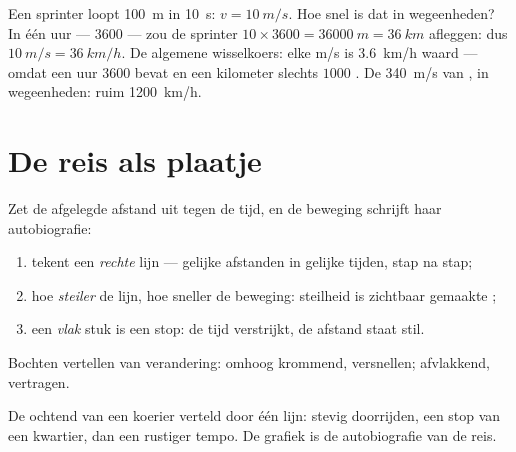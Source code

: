 \begin{example}\label{ex:g7:motion-average-speed:units}
Een sprinter loopt \qty{100}{m} in \qty{10}{s}: $v = \qty{10}{m/s}$.
Hoe snel is dat in wegeenheden? In één uur --- $3600$  ---
zou de sprinter $10 \times 3600 = \qty{36000}{m} = \qty{36}{km}$
afleggen: dus $\qty{10}{m/s} = \qty{36}{km/h}$. De algemene
wisselkoers: elke \unit{m/s} is \qty{3.6}{km/h} waard --- omdat een uur
$3600$  bevat en een kilometer slechts $1000$
. De \qty{340}{m/s} van , in
wegeenheden: ruim \qty{1200}{km/h}.
\end{example}

\section{De reis als plaatje}

\begin{proposition}[De grafiekwetten]\label{prop:g7:motion-average-speed:graphs}
Zet de afgelegde afstand uit tegen de tijd, en de beweging schrijft haar
autobiografie:
\begin{enumerate}
  \item {} tekent een \emph{rechte} lijn ---
        gelijke afstanden in gelijke tijden, stap na stap;
  \item hoe \emph{steiler} de lijn, hoe sneller de beweging:
        steilheid is zichtbaar gemaakte ;
  \item een \emph{vlak} stuk is een stop: de tijd verstrijkt, de
        afstand staat stil.
\end{enumerate}
Bochten vertellen van verandering: omhoog krommend, versnellen;
afvlakkend, vertragen.
\end{proposition}

\begin{omfigure}

{\small De ochtend van een koerier verteld door één lijn: stevig
doorrijden, een stop van een kwartier, dan een rustiger tempo. De
grafiek is de autobiografie van de reis.}
\end{omfigure}

